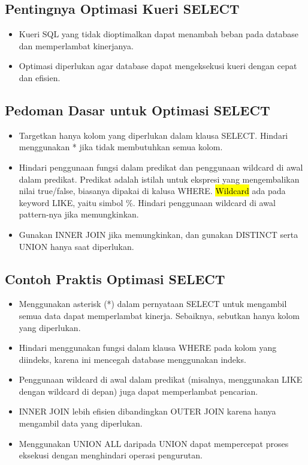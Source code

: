 \documentclass{article}
\begin{document}
\subsection{Pentingnya Optimasi Kueri SELECT}
\begin{itemize}
    \item Kueri SQL yang tidak dioptimalkan dapat menambah beban pada database dan memperlambat kinerjanya.
    \item Optimasi diperlukan agar database dapat mengeksekusi kueri dengan cepat dan efisien.
\end{itemize}

\subsection{Pedoman Dasar untuk Optimasi SELECT}
\begin{itemize}
    \item Targetkan hanya kolom yang diperlukan dalam klausa SELECT. Hindari menggunakan * jika tidak membutuhkan semua kolom.
    \item Hindari penggunaan fungsi dalam predikat dan penggunaan wildcard di awal dalam predikat. Predikat adalah istilah untuk ekspresi yang mengembalikan nilai true/false, biasanya dipakai di kalusa WHERE. \hl{Wildcard} ada pada keyword LIKE, yaitu simbol \%. Hindari penggunaan wildcard di awal pattern-nya jika memungkinkan.
    \item Gunakan INNER JOIN jika memungkinkan, dan gunakan DISTINCT serta UNION hanya saat diperlukan.
\end{itemize}

\subsection{Contoh Praktis Optimasi SELECT}
\begin{itemize}
    \item Menggunakan asterisk (*) dalam pernyataan SELECT untuk mengambil semua data dapat memperlambat kinerja. Sebaiknya, sebutkan hanya kolom yang diperlukan.
    \item Hindari menggunakan fungsi dalam klausa WHERE pada kolom yang diindeks, karena ini mencegah database menggunakan indeks.
    \item Penggunaan wildcard di awal dalam predikat (misalnya, menggunakan LIKE dengan wildcard di depan) juga dapat memperlambat pencarian.
    \item INNER JOIN lebih efisien dibandingkan OUTER JOIN karena hanya mengambil data yang diperlukan.
    \item Menggunakan UNION ALL daripada UNION dapat mempercepat proses eksekusi dengan menghindari operasi pengurutan.
\end{itemize}
\end{document}
